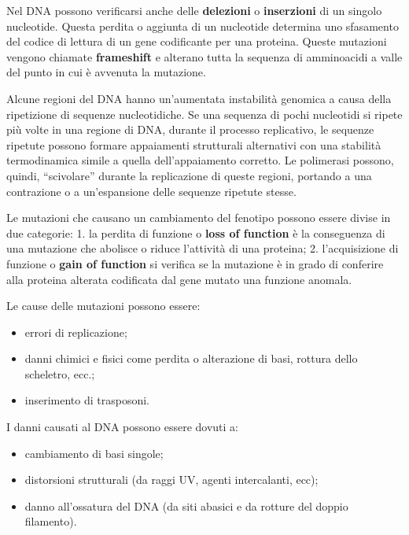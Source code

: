 \documentclass[11pt]{book}
\begin{document}
Nel DNA possono verificarsi anche delle \textbf{delezioni} o
\textbf{inserzioni} di un singolo nucleotide. Questa perdita o aggiunta
di un nucleotide determina uno sfasamento del codice di lettura di un
gene codificante per una proteina. Queste mutazioni vengono chiamate
\textbf{frameshift} e alterano tutta la sequenza di amminoacidi a valle
del punto in cui è avvenuta la mutazione.

Alcune regioni del DNA hanno un'aumentata instabilità genomica a causa
della ripetizione di sequenze nucleotidiche. Se una sequenza di pochi
nucleotidi si ripete più volte in una regione di DNA, durante il
processo replicativo, le sequenze ripetute possono formare appaiamenti
strutturali alternativi con una stabilità termodinamica simile a quella
dell'appaiamento corretto. Le polimerasi possono, quindi, ``scivolare''
durante la replicazione di queste regioni, portando a una contrazione o
a un'espansione delle sequenze ripetute stesse.

Le mutazioni che causano un cambiamento del fenotipo possono essere
divise in due categorie: 1. la perdita di funzione o \textbf{loss of
function} è la conseguenza di una mutazione che abolisce o riduce
l'attività di una proteina; 2. l'acquisizione di funzione o \textbf{gain
of function} si verifica se la mutazione è in grado di conferire alla
proteina alterata codificata dal gene mutato una funzione anomala.

Le cause delle mutazioni possono essere:

\begin{itemize}
\itemsep1pt\parskip0pt
\item
  errori di replicazione;
\item
  danni chimici e fisici come perdita o alterazione di basi, rottura
  dello scheletro, ecc.;
\item
  inserimento di trasposoni.
\end{itemize}

I danni causati al DNA possono essere dovuti a:

\begin{itemize}
\itemsep1pt\parskip0pt
\item
  cambiamento di basi singole;
\item
  distorsioni strutturali (da raggi UV, agenti intercalanti, ecc);
\item
  danno all'ossatura del DNA (da siti abasici e da rotture del doppio
  filamento).
\end{itemize}
\end{document}
